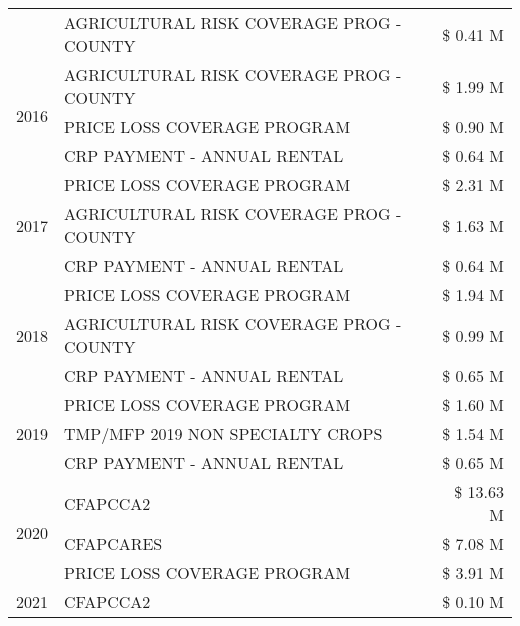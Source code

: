\begin{tabular}{llr}
 & AGRICULTURAL RISK COVERAGE PROG - COUNTY & \$ 0.41 M \\
\cline{1-3}
\multirow[t]{3}{*}{2016} & AGRICULTURAL RISK COVERAGE PROG - COUNTY      & \$ 1.99 M \\
 & PRICE LOSS COVERAGE PROGRAM                   & \$ 0.90 M \\
 & CRP PAYMENT - ANNUAL RENTAL                   & \$ 0.64 M \\
\cline{1-3}
\multirow[t]{3}{*}{2017} & PRICE LOSS COVERAGE PROGRAM & \$ 2.31 M \\
 & AGRICULTURAL RISK COVERAGE PROG - COUNTY & \$ 1.63 M \\
 & CRP PAYMENT - ANNUAL RENTAL & \$ 0.64 M \\
\cline{1-3}
\multirow[t]{3}{*}{2018} & PRICE LOSS COVERAGE PROGRAM & \$ 1.94 M \\
 & AGRICULTURAL RISK COVERAGE PROG - COUNTY & \$ 0.99 M \\
 & CRP PAYMENT - ANNUAL RENTAL & \$ 0.65 M \\
\cline{1-3}
\multirow[t]{3}{*}{2019} & PRICE LOSS COVERAGE PROGRAM & \$ 1.60 M \\
 & TMP/MFP 2019 NON SPECIALTY CROPS & \$ 1.54 M \\
 & CRP PAYMENT - ANNUAL RENTAL & \$ 0.65 M \\
\cline{1-3}
\multirow[t]{3}{*}{2020} & CFAPCCA2 & \$ 13.63 M \\
 & CFAPCARES & \$ 7.08 M \\
 & PRICE LOSS COVERAGE PROGRAM & \$ 3.91 M \\
\cline{1-3}
2021 & CFAPCCA2 & \$ 0.10 M \\
\cline{1-3}
\bottomrule
\end{tabular}

